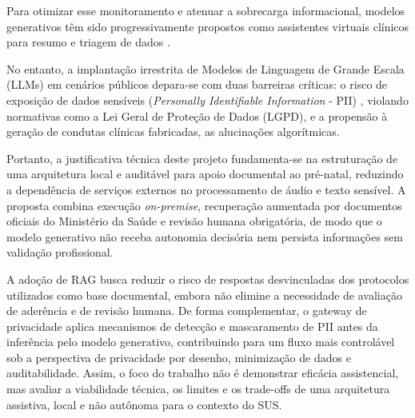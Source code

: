 \documentclass[12pt]{article}
\begin{document}
Para otimizar esse monitoramento e atenuar a sobrecarga informacional, modelos generativos têm sido progressivamente propostos como assistentes virtuais clínicos para resumo e triagem de dados \cite{Clusmann2023, Rajpurkar2022}.

No entanto, a implantação irrestrita de Modelos de Linguagem de Grande Escala (LLMs) em cenários públicos depara-se com duas barreiras críticas: o risco de exposição de dados sensíveis (\textit{Personally Identifiable Information} - PII) \cite{OWASPLLM2025}, violando normativas como a Lei Geral de Proteção de Dados (LGPD), e a propensão à geração de condutas clínicas fabricadas, as alucinações algorítmicas.

Portanto, a justificativa técnica deste projeto fundamenta-se na estruturação de uma arquitetura local e auditável para apoio documental ao pré-natal, reduzindo a dependência de serviços externos no processamento de áudio e texto sensível.
A proposta combina execução \textit{on-premise}, recuperação aumentada por documentos oficiais do Ministério da Saúde e revisão humana obrigatória, de modo que o modelo generativo não receba autonomia decisória nem persista informações sem validação profissional.

A adoção de RAG busca reduzir o risco de respostas desvinculadas dos protocolos utilizados como base documental, embora não elimine a necessidade de avaliação de aderência e de revisão humana.
De forma complementar, o gateway de privacidade aplica mecanismos de detecção e mascaramento de PII antes da inferência pelo modelo generativo, contribuindo para um fluxo mais controlável sob a perspectiva de privacidade por desenho, minimização de dados e auditabilidade.
Assim, o foco do trabalho não é demonstrar eficácia assistencial, mas avaliar a viabilidade técnica, os limites e os trade-offs de uma arquitetura assistiva, local e não autônoma para o contexto do SUS.

\end{document}
